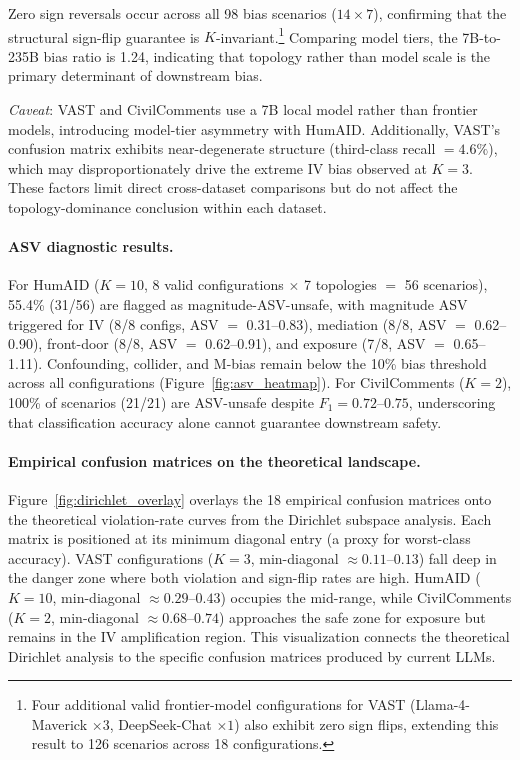 Zero sign reversals occur across all 98 bias scenarios ($14 \times 7$), confirming that the structural sign-flip guarantee is $K$-invariant.\footnote{Four additional valid frontier-model configurations for VAST (Llama-4-Maverick $\times 3$, DeepSeek-Chat $\times 1$) also exhibit zero sign flips, extending this result to 126 scenarios across 18 configurations.} Comparing model tiers, the 7B-to-235B bias ratio is 1.24, indicating that topology rather than model scale is the primary determinant of downstream bias.

\emph{Caveat}: VAST and CivilComments use a 7B local model rather than frontier models, introducing model-tier asymmetry with HumAID. Additionally, VAST's confusion matrix exhibits near-degenerate structure (third-class recall $= 4.6\%$), which may disproportionately drive the extreme IV bias observed at $K{=}3$. These factors limit direct cross-dataset comparisons but do not affect the topology-dominance conclusion within each dataset.

\paragraph{ASV diagnostic results.}
For HumAID ($K{=}10$, 8 valid configurations $\times$ 7 topologies $=$ 56 scenarios), 55.4\% (31/56) are flagged as magnitude-ASV-unsafe, with magnitude ASV triggered for IV (8/8 configs, ASV $=$ 0.31--0.83), mediation (8/8, ASV $=$ 0.62--0.90), front-door (8/8, ASV $=$ 0.62--0.91), and exposure (7/8, ASV $=$ 0.65--1.11). Confounding, collider, and M-bias remain below the 10\% bias threshold across all configurations (Figure~\ref{fig:asv_heatmap}). For CivilComments ($K{=}2$), 100\% of scenarios (21/21) are ASV-unsafe despite $F_1{=}0.72$--$0.75$, underscoring that classification accuracy alone cannot guarantee downstream safety.

\paragraph{Empirical confusion matrices on the theoretical landscape.}
Figure~\ref{fig:dirichlet_overlay} overlays the 18 empirical confusion matrices onto the theoretical violation-rate curves from the Dirichlet subspace analysis. Each matrix is positioned at its minimum diagonal entry (a proxy for worst-class accuracy). VAST configurations ($K{=}3$, min-diagonal $\approx 0.11$--$0.13$) fall deep in the danger zone where both violation and sign-flip rates are high. HumAID ($K{=}10$, min-diagonal $\approx 0.29$--$0.43$) occupies the mid-range, while CivilComments ($K{=}2$, min-diagonal $\approx 0.68$--$0.74$) approaches the safe zone for exposure but remains in the IV amplification region. This visualization connects the theoretical Dirichlet analysis to the specific confusion matrices produced by current LLMs.

